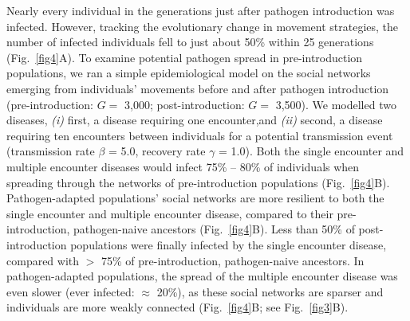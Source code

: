 Nearly every individual in the generations just after pathogen introduction was infected.
However, tracking the evolutionary change in movement strategies, the number of infected individuals fell to just about 50\% within 25 generations (Fig.~\ref{fig4}A).
To examine potential pathogen spread in pre-introduction populations, we ran a simple epidemiological model on the social networks emerging from individuals' movements before and after pathogen introduction (pre-introduction: $G =$ 3,000; post-introduction: $G =$ 3,500).
We modelled two diseases, \textit{(i)} first, a disease requiring one encounter,and \textit{(ii)} second, a disease requiring ten encounters between individuals for a potential transmission event (transmission rate $\beta$ = 5.0, recovery rate $\gamma$ = 1.0).
Both the single encounter and multiple encounter diseases would infect 75\% -- 80\% of individuals when spreading through the networks of pre-introduction populations (Fig.~\ref{fig4}B).
Pathogen-adapted populations' social networks are more resilient to both the single encounter and multiple encounter disease, compared to their pre-introduction, pathogen-naive ancestors (Fig.~\ref{fig4}B).
Less than 50\% of post-introduction populations were finally infected by the single encounter disease, compared with $>$ 75\% of pre-introduction, pathogen-naive ancestors.
In pathogen-adapted populations, the spread of the multiple encounter disease was even slower (ever infected: $\approx$ 20\%), as these social networks are sparser and individuals are more weakly connected (Fig.~\ref{fig4}B; see Fig.~\ref{fig3}B).

